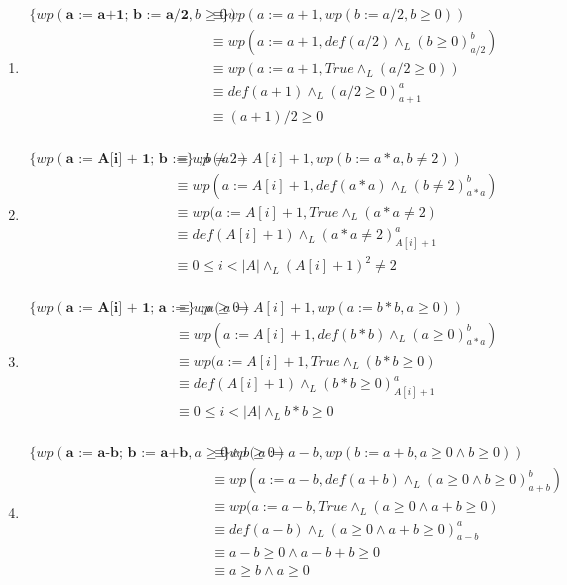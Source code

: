 \documentclass{article}
\begin{document}
\begin{enumerate}[label=\alph*)]
	\item
		
		\begin{align*}
		\{wp(\textbf{a := a+1; b := a/2}, b \geq 0)\}
		 &\equiv 	wp(a:=a+1,wp(b:=a/2,b\geq 0))\\	
		 &\equiv wp(a:=a+1,def(a/2)\wedge_L (b\geq 0)_{a/2}^{b})\\	
		 &\equiv wp(a:=a+1,True\wedge_L (a/2\geq 0))\\
		 &\equiv def(a+1)\wedge_L (a/2\geq 0)_{a+1}^{a}\\	
		  &\equiv  (a+1)/2\geq 0\\		
		\end{align*}
		
	\item
		\begin{align*}
		\{wp(\textbf{a := A[i] + 1; b := a*a}, b\neq 2)\}
		 &\equiv 	wp(a:= A[i] + 1,wp(b:= a*a,b\neq 2))\\	
		 &\equiv wp(a:= A[i] + 1,def( a*a)\wedge_L (b\neq 2)_{ a*a}^{b})\\	
		 &\equiv wp(a:= A[i] + 1,True\wedge_L (a*a\neq 2)\\
		 &\equiv def(A[i] + 1)\wedge_L (a*a\neq 2)_{A[i] + 1}^{a}\\	
		  &\equiv  0\leq i<|A| \wedge_L (A[i]+1)^2\neq 2\\	
		\end{align*}
	\item
		\begin{align*}
		\{wp(\textbf{a := A[i] + 1; a := b*b}, a\geq 0)\}
		 &\equiv wp(a:= A[i] + 1,wp(a := b*b,a\geq 0))\\	
		 &\equiv wp(a:= A[i] + 1,def( b*b)\wedge_L (a\geq 0)_{ a*a}^{b})\\	
		 &\equiv wp(a:= A[i] + 1,True\wedge_L (b*b\geq 0)\\
		 &\equiv def(A[i] + 1)\wedge_L (b*b\geq 0)_{A[i] + 1}^{a}\\	
		  &\equiv  0\leq i<|A| \wedge_L b*b\geq 0\\	
		\end{align*}
	\item
		\begin{align*}
		\{wp(\textbf{a := a-b; b := a+b},  a \geq 0 \wedge b \geq 0)\}
		 &\equiv wp(a := a-b,wp(b := a+b,a \geq 0 \wedge b \geq 0))\\	
		 &\equiv wp(a := a-b,def( a+b)\wedge_L (a \geq 0 \wedge b \geq 0)_{a+b}^{b})\\	
		 &\equiv wp(a := a-b,True\wedge_L (a \geq 0 \wedge a+b \geq 0)\\
		 &\equiv def(a-b)\wedge_L (a \geq 0 \wedge a+b \geq 0)_{a-b}^{a}\\	
		  &\equiv  a-b \geq 0 \wedge a-b+b \geq 0\\
		  &\equiv  a \geq b \wedge a \geq 0\\
		\end{align*}
\end{enumerate}
\end{document}
